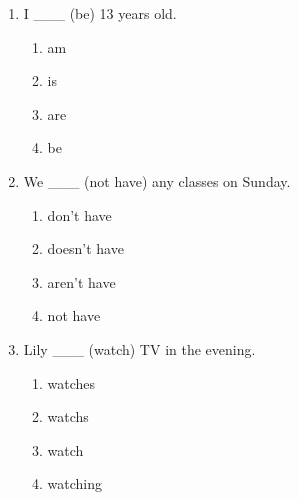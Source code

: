 \documentclass[11pt,a4paper]{ctexart}
\begin{document}
\begin{enumerate}[leftmargin=*,itemsep=4pt]
\begin{enumerate}[label=\Alph*.,leftmargin=2em,itemsep=1pt,topsep=2pt]
\end{enumerate}
\item I \_\_\_ (be) 13 years old.
\begin{enumerate}[label=\Alph*.,leftmargin=2em,itemsep=1pt,topsep=2pt]
\item am
\item is
\item are
\item be
\end{enumerate}
\item We \_\_\_ (not have) any classes on Sunday.
\begin{enumerate}[label=\Alph*.,leftmargin=2em,itemsep=1pt,topsep=2pt]
\item don’t have
\item doesn’t have
\item aren’t have
\item not have
\end{enumerate}
\item Lily \_\_\_ (watch) TV in the evening.
\begin{enumerate}[label=\Alph*.,leftmargin=2em,itemsep=1pt,topsep=2pt]
\item watches
\item watchs
\item watch
\item watching
\end{enumerate}
\end{enumerate}

\newpage
\end{document}
